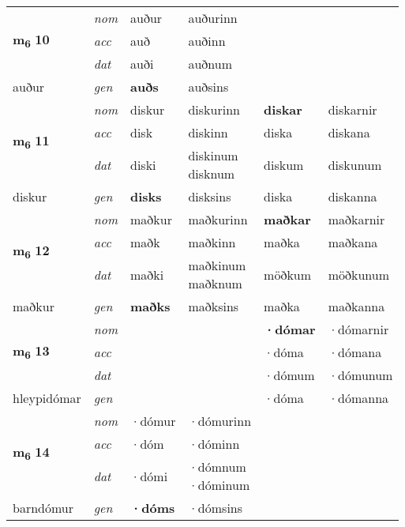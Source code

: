 \begin{longtable}[l]{X>{\footnotesize\itshape}XXXXX}
\multirow{3}{*}{{{\textbf{m{\textsubscript{6}}} \Large{\textbf{10}}}}}  
 & nom & auður & auðurinn    & \textbf{} &   \\*
 & acc & auð  & auðinn   &   &  \\*
 & dat & auði & auðnum   &  &  \\*
 {\footnotesize{auður}} &  gen & \textbf{auðs}  & auðsins  &  &  \\
\cmidrule{1-6}


\multirow{3}{*}{{{\textbf{m{\textsubscript{6}}} \Large{\textbf{11}}}}}  
 & nom & diskur & diskurinn    & \textbf{diskar} & diskarnir  \\*
 & acc & disk  & diskinn   & diska  & diskana \\*
 & dat & diski & \specialcell{diskinum\\ disknum}   & diskum & diskunum \\*
 {\footnotesize{diskur}} &  gen & \textbf{disks}  & disksins  & diska & diskanna \\
\cmidrule{1-6}


\multirow{3}{*}{{{\textbf{m{\textsubscript{6}}} \Large{\textbf{12}}}}}  
 & nom & maðkur & maðkurinn    & \textbf{maðkar} & maðkarnir  \\*
 & acc & maðk  & maðkinn   & maðka  & maðkana \\*
 & dat & maðki & \specialcell{maðkinum\\ maðknum}   & möðkum & möðkunum \\*
 {\footnotesize{maðkur}} &  gen & \textbf{maðks}  & maðksins  & maðka & maðkanna \\
\cmidrule{1-6}


\multirow{3}{*}{{{\textbf{m{\textsubscript{6}}} \Large{\textbf{13}}}}}  
 & nom &  &     & \textbf{·dómar} & ·dómarnir  \\*
 & acc &   &    & ·dóma  & ·dómana \\*
 & dat &  &    & ·dómum & ·dómunum \\*
 {\footnotesize{hleypidómar}} &  gen & \textbf{}  &   & ·dóma & ·dómanna \\
\cmidrule{1-6}


\multirow{3}{*}{{{\textbf{m{\textsubscript{6}}} \Large{\textbf{14}}}}}  
 & nom & ·dómur & ·dómurinn    & \textbf{} &   \\*
 & acc & ·dóm  & ·dóminn   &   &  \\*
 & dat & ·dómi & \specialcell{·dómnum\\  ·dóminum}   &  &  \\*
 {\footnotesize{barndómur}} &  gen & \textbf{·dóms}  & ·dómsins  &  &  \\
\cmidrule{1-6}



\end{longtable}
